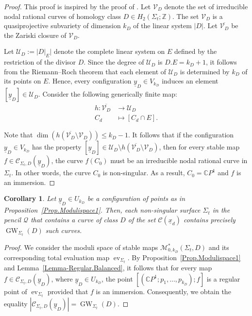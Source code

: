 \documentclass[11pt]{amsart}
\numberwithin{equation}{section}
\theoremstyle{definition}
\theoremstyle{plain}
\newtheorem{corollary}[definition]{Corollary}
\theoremstyle{remark}
\newcommand{\Z}{\mathbb{Z}}
\newcommand{\C}{\mathbb{C}}
\DeclareMathOperator{\GW}{GW}
\DeclareMathOperator{\ev}{ev}
\newcommand{\lra}{\longrightarrow}
\begin{document}
 \begin{proof}
   This proof is inspired by the proof of \cite[Proposition~5.2]{brugalle2016pencils}.
   Let $\mathcal{V}_D$ denote the set of irreducible nodal rational curves of homology class $D\in H_2(\Sigma_t;\Z)$. The set $\mathcal{V}_D$ is a quasiprojective subvariety of dimension $k_D$ of the linear system $|D|$. 
    Let $\overline{\mathcal{V}_D}$ be the Zariski closure of $\mathcal{V}_D$.
    
   Let $\mathcal{U}_D:=|D|_E|$ denote the complete linear system on $E$ defined by the restriction of the divisor $D$. Since the degree of $\mathcal{U}_D$ is $D.E=k_D+1$, it follows from the Riemann--Roch theorem that each element of $\mathcal{U}_D$ is determined by $k_D$ of its points on $E$. Hence, every configuration $\underline{y}_D\in V_{k_D}$ induces an element $[ \underline{y}_D]\in \mathcal{U}_D$. Consider the following generically finite map:
   \begin{align*}
    h\colon \overline{\mathcal{V}_D} &\lra \mathcal{U}_D\\
    C_d&\longmapsto [C_d\cap E] .
\end{align*}

   Note that $\dim (h(\overline{\mathcal{V}_D}\setminus \mathcal{V}_D))\leq k_D-1$. It follows that if the configuration $\underline{y}_D\in V_{k_D}$ has the property $[{\underline{y}}_D] \in\mathcal{U}_D\setminus h(\overline{\mathcal{V}_D}\setminus \mathcal{V}_D)$, then 
    for every stable map $f\in \mathcal{C}_{\Sigma_t,D}(\underline{y}_D)$, the curve $f(C_0)$ must be an irreducible nodal rational curve in $\Sigma_t$. 
    In other words, the curve $C_0$ is non-singular. As a result, $C_0=\C P^1$ and $f$ is an immersion.
 \end{proof}
 
 \begin{corollary}\label{Corollary.Modulispace1}
 Let $\underline{y}_D\in U_{k_D}$ be a configuration of points as in Proposition~\ref{Prop.Modulispace1}. 
 Then, each non-singular surface $\Sigma_t$ in the pencil $\mathcal{Q}$ that contains a curve of class $D$ of the set $\mathcal{C}(\underline{x}_d)$  contains  precisely $\GW_{\Sigma_t}(D)$ such curves.
    \end{corollary}

 \begin{proof}
We consider the moduli space of stable maps $\mathcal{M}^*_{0,k_D}(\Sigma_t,D)$ and its corresponding total evaluation map $\ev_{\Sigma_t}$. By Proposition~\ref{Prop.Modulispace1} and Lemma~\ref{Lemma-Regular.Balanced}, it follows that for every map $f\in\mathcal{C}_{\Sigma_t,D}(\underline{y}_D)$, where $\underline{y}_D\in U_{k_D}$, the point $[(\C P^1;p_1,\ldots,p_{k_D});f]$ is a regular point of  $\ev_{\Sigma_t}$ provided that $f$ is an immersion. Consequently, we obtain the equality $|\mathcal{C}_{\Sigma_t,D}(\underline{y}_D)|=\GW_{\Sigma_t}(D)$.
 \end{proof}
 
\end{document}
